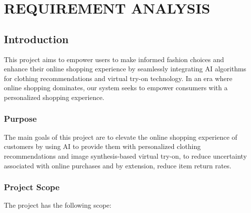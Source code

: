 \chapter[Requirement Analysis]{REQUIREMENT ANALYSIS}

\section{Introduction}
	This project aims to empower users to make informed fashion choices and enhance their online shopping experience by seamlessly integrating AI algorithms for clothing recommendations and virtual try-on technology. In an era where online shopping dominates, our system seeks to empower consumers with a personalized shopping experience.

	\subsection{Purpose}
        The main goals of this project are to elevate the online shopping experience of customers by using AI to provide them with personalized clothing recommendations and image synthesis-based virtual try-on, to reduce uncertainty associated with online purchases and by extension, reduce item return rates.

	\subsection{Project Scope}
		The project has the following scope:

